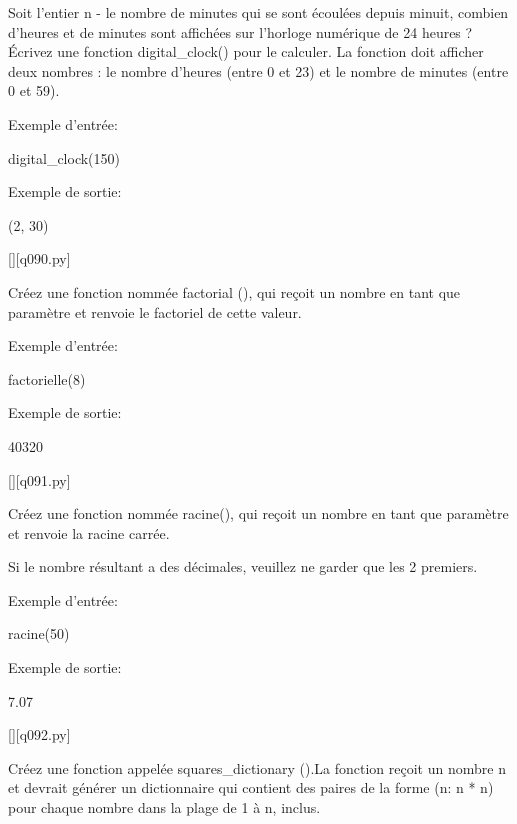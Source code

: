 		\question
		Soit l'entier n - le nombre de minutes qui se sont écoulées depuis minuit, combien d'heures et de minutes sont affichées sur l'horloge numérique de 24 heures ? Écrivez une fonction digital\_clock() pour le calculer. La fonction doit afficher deux nombres : le nombre d'heures (entre 0 et 23) et le nombre de minutes (entre 0 et 59).
		
		Exemple d'entrée:
		
		digital\_clock(150)
		
		Exemple de sortie:
		
		(2, 30)
		\par
		\renewcommand{\nomfichier}{q090.py}
		\begin{solution}
		    \pythonfile{\chemincode \nomfichier}[][\nomfichier]
		\end{solution}
        
		\question
		Créez une fonction nommée factorial (), qui reçoit un nombre en tant que paramètre et renvoie le factoriel de cette valeur.
		
		Exemple d'entrée:
		
		factorielle(8)
		
		Exemple de sortie:
		
		40320
		\par
		\renewcommand{\nomfichier}{q091.py}
		\begin{solution}
		    \pythonfile{\chemincode \nomfichier}[][\nomfichier]
		\end{solution}
        
		\question
		Créez une fonction nommée racine(), qui reçoit un nombre en tant que paramètre et renvoie la racine carrée.
		
		Si le nombre résultant a des décimales, veuillez ne garder que les 2 premiers.
		
		Exemple d'entrée:
		
		racine(50)
		
		Exemple de sortie:
		
		7.07
		\par
		\renewcommand{\nomfichier}{q092.py}
		\begin{solution}
		    \pythonfile{\chemincode \nomfichier}[][\nomfichier]
		\end{solution}
        
		\question
		Créez une fonction appelée squares\_dictionary ().La fonction reçoit un nombre n et devrait générer un dictionnaire qui contient des paires de la forme (n: n * n) pour chaque nombre dans la plage de 1 à n, inclus.
		
